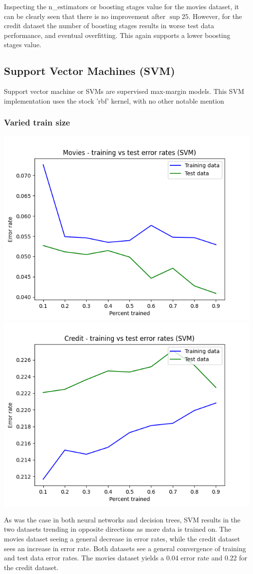 \documentclass{article}
\begin{document}
Inspecting the n\_estimators or boosting stages value for the movies dataset, it can be clearly seen that there is no improvement after $\sup 25$. However, for the credit dataset the number of boosting stages results in worse test data performance, and eventual overfitting. This again supports a lower boosting stages value.

\subsection{Support Vector Machines (SVM)}

Support vector machine or SVMs are supervised max-margin models. This SVM implementation uses the stock 'rbf' kernel, with no other notable mention

\subsubsection{Varied train size}

\begin{center}
    \includegraphics[width=.45\linewidth]{movies-svc-error.png}
    \includegraphics[width=.45\linewidth]{credit-svc-error.png}
\end{center}

As was the case in both neural networks and decision trees, SVM results in the two datasets trending in opposite directions as more data is trained on. The movies dataset seeing a general decrease in error rates, while the credit dataset sees an increase in error rate. Both datasets see a general convergence of training and test data error rates. The movies dataset yields a 0.04 error rate and 0.22 for the credit dataset.
\end{document}
